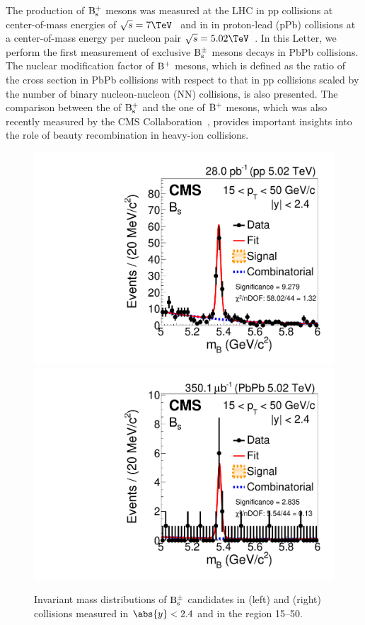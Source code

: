 The production of $\rm B_{\rm s }^{+}$ mesons was measured at the LHC in pp collisions at center-of-mass energies of $\sqrts=7\TeV$~\cite{Chatrchyan:2011vh}
and in in proton-lead (pPb) collisions at a center-of-mass energy per nucleon pair $\sqrts=5.02\TeV$~\cite{Khachatryan:2015uja}.
In this Letter, we perform the first measurement of exclusive $\rm B_{\rm s }^{\pm}$ mesons decays in PbPb collisions. The nuclear modification factor \RAA of $\rm B^{+}$ mesons, 
which is defined as the ratio of the cross section in PbPb collisions with respect to that in pp collisions scaled by the number of binary nucleon-nucleon (NN) collisions, 
is also presented. The comparison between the \RAA of $\rm B_{\rm s }^{+}$ and the one of $\rm B^{+}$ mesons, which was also recently measured by the CMS Collaboration~\cite{PhysRevLett.119.152301}, provides
important insights into the role of beauty recombination in heavy-ion collisions. 


\begin{figure}[tb]
\centering
\includegraphics[width=.49\textwidth]{plots/data_pp_15_50.pdf}
\includegraphics[width=.49\textwidth]{plots/data_PbPb_15_50.pdf}
\caption{Invariant mass distributions of $\rm B_{\rm s }^{\pm}$ candidates in \pp (left) and \PbPb (right) collisions measured in $\abs{y}<2.4$ and in the \pt region 15--50\GeVc.} 
\label{fig:rawYieldsBsmeson}
\end{figure}

